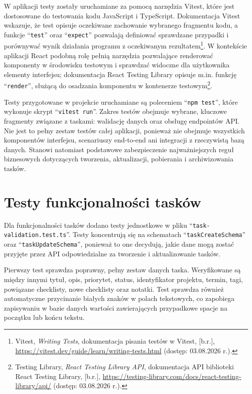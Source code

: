 \documentclass[12pt,a4paper,twoside]{report}
\newcommand{\FirstParagraph}{\noindent\ignorespaces}
\begin{document}
W aplikacji testy zostały uruchamiane za pomocą narzędzia Vitest, które jest dostosowane do testowania kodu JavaScript i TypeScript. Dokumentacja Vitest wskazuje, że test opisuje oczekiwane zachowanie wybranego fragmentu kodu, a funkcje ``\texttt{test}'' oraz ``\texttt{expect}'' pozwalają definiować sprawdzane przypadki i porównywać wynik działania programu z oczekiwanym rezultatem\footnote{Vitest, \emph{Writing Tests}, dokumentacja pisania testów w Vitest, [b.r.], \url{https://vitest.dev/guide/learn/writing-tests.html} (dostęp: 03.08.2026 r.).}. W kontekście aplikacji React podobną rolę pełnią narzędzia pozwalające renderować komponenty w środowisku testowym i sprawdzać widoczne dla użytkownika elementy interfejsu; dokumentacja React Testing Library opisuje m.in. funkcję ``\texttt{render}'', służącą do osadzania komponentu w kontenerze testowym\footnote{Testing Library, \emph{React Testing Library API}, dokumentacja API biblioteki React Testing Library, [b.r.], \url{https://testing-library.com/docs/react-testing-library/api/} (dostęp: 03.08.2026 r.).}.

Testy przygotowane w projekcie uruchamiane są poleceniem ``\texttt{npm test}'', które wykonuje skrypt ``\texttt{vitest run}''. Zakres testów obejmuje wybrane, kluczowe fragmenty związane z taskami: walidację danych oraz obsługę endpointów API. Nie jest to pełny zestaw testów całej aplikacji, ponieważ nie obejmuje wszystkich komponentów interfejsu, scenariuszy end-to-end ani integracji z rzeczywistą bazą danych. Stanowi natomiast podstawowe zabezpieczenie najważniejszych reguł biznesowych dotyczących tworzenia, aktualizacji, pobierania i archiwizowania tasków.

\section{Testy funkcjonalności tasków}

\FirstParagraph Dla funkcjonalności tasków dodano testy jednostkowe w pliku ``\texttt{task-validation.test.ts}''. Testy koncentrują się na schematach ``\texttt{taskCreateSchema}'' oraz ``\texttt{taskUpdateSchema}'', ponieważ to one decydują, jakie dane mogą zostać przyjęte przez API odpowiedzialne za tworzenie i aktualizowanie tasków.

Pierwszy test sprawdza poprawny, pełny zestaw danych taska. Weryfikowane są między innymi tytuł, opis, priorytet, status, identyfikator projektu, termin, tagi, powiązane checklisty, nowe checklisty oraz notatki. Test sprawdza również automatyczne przycinanie białych znaków w polach tekstowych, co zapobiega zapisywaniu w bazie danych wartości zawierających przypadkowe spacje na początku lub końcu tekstu.
\end{document}
